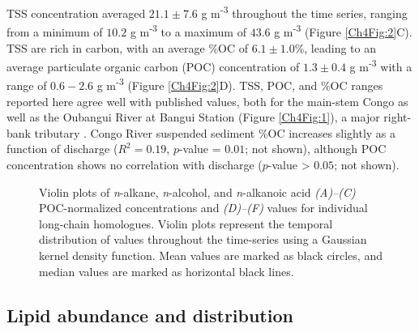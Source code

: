 TSS concentration averaged $21.1 \pm 7.6$ g m\textsuperscript{-3} throughout the time series, ranging from a minimum of $10.2$ g m\textsuperscript{-3} to a maximum of $43.6$ g m\textsuperscript{-3} (Figure \ref{Ch4Fig:2}C). TSS are rich in carbon, with an average \%OC of $6.1 \pm 1.0$\%, leading to an average particulate organic carbon (POC) concentration of $1.3 \pm 0.4$ g m\textsuperscript{-3} with a range of $0.6 - 2.6$ g m\textsuperscript{-3} (Figure \ref{Ch4Fig:2}D). TSS, POC, and \%OC ranges reported here agree well with published values, both for the main-stem Congo as well as the Oubangui River at Bangui Station (Figure \ref{Ch4Fig:1}), a major right-bank tributary \citep{Coynel:2005cn,Bouillon:2012cw,Bouillon:2014ko}. Congo River suspended sediment \%OC increases slightly as a function of discharge ($R^2 = 0.19$, $p$-value = $0.01$; not shown), although POC concentration shows no correlation with discharge ($p$-value > $0.05$; not shown). 

\begin{figure}[t]
	\caption[Concentration and  violin plots]{Violin plots of \textit{n}-alkane, \textit{n}-alcohol, and \textit{n}-alkanoic acid \textit{(A)--(C)} POC-normalized concentrations and \textit{(D)--(F)}  values for individual long-chain homologues. Violin plots represent the temporal distribution of values throughout the time-series using a Gaussian kernel density function. Mean values are marked as black circles, and median values are marked as horizontal black lines.}
	\label{Ch4Fig:3} 
\end{figure}

\subsection{Lipid abundance and distribution}

